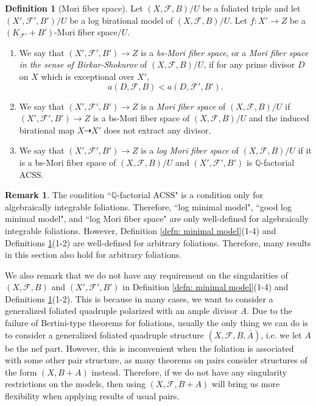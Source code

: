 \documentclass[11pt]{amsart}
\numberwithin{equation}{section}
\newcommand{\Qq}{\mathbb{Q}}
\newcommand{\Ff}{\mathcal{F}}
\theoremstyle{definition}
\newtheorem{defn}[thm]{Definition}
\theoremstyle{definition}
\newtheorem{rem}[thm]{Remark}
\theoremstyle{definition}
\begin{document}
\begin{defn}[Mori fiber space]\label{defn: mfs}
Let $(X,\Ff,B)/U$ be a foliated triple and let $(X',\Ff',B')/U$ be a log birational model of $(X,\Ff,B)/U$. Let $f: X'\rightarrow Z$ be a $(K_{\Ff'}+B')$-Mori fiber space$/U$.
\begin{enumerate}
\item We say that $(X',\Ff',B')\rightarrow Z$ is a \emph{bs-Mori fiber space}, or a \emph{Mori fiber space in the sense of Birkar-Shokurov} of $(X,\Ff,B)/U$, if for any prime divisor $D$ on $X$ which is exceptional over $X'$, 
$$a(D,\Ff,B)<a(D,\Ff',B').$$
\item We say that $(X',\Ff',B')\rightarrow Z$ is a \emph{Mori fiber space} of $(X,\Ff,B)/U$ if $(X',\Ff',B')\rightarrow Z$  is a bs-Mori fiber space of $(X,\Ff,B)/U$ and the induced birational map $X\dashrightarrow X'$ does not extract any divisor.
\item We say that  $(X',\Ff',B')\rightarrow Z$ is a \emph{log Mori fiber space} of $(X,\Ff,B)/U$ if it is a bs-Mori fiber space of $(X,\Ff,B)/U$ and $(X',\Ff',B')$ is $\Qq$-factorial ACSS.
\end{enumerate}
\end{defn}

\begin{rem}
The condition ``$\Qq$-factorial ACSS" is a condition only for algebraically integrable foliations. Therefore, ``log minimal model", ``good log minimal model", and ``log Mori fiber space" are only well-defined for algebraically integrable foliations. However, Definition \ref{defn: minimal model}(1-4) and Definitions \ref{defn: mfs}(1-2) are well-defined for arbitrary foliations. Therefore, many results in this section also hold for arbitrary foliations.

We also remark that we do not have any requirement on the singularities of $(X,\Ff,B)$ and $(X',\Ff',B')$ in  Definition \ref{defn: minimal model}(1-4) and Definitions \ref{defn: mfs}(1-2). This is because in many cases, we want to consider a generalized foliated quadruple polarized with an ample divisor $A$. Due to the failure of Bertini-type theorems for foliations, usually the only thing we can do is to consider a generalized foliated quadruple structure $(X,\Ff,B,\bar A)$, i.e. we let $A$ be the nef part. However, this is inconvenient when the foliation is associated with some other pair structure, as many theorems on pairs consider structures of the form $(X,B+A)$ instead. Therefore, if we do not have any singularity restrictions on the models, then using $(X,\Ff,B+A)$ will bring us more flexibility when applying results of usual pairs.
\end{rem}
\end{document}

